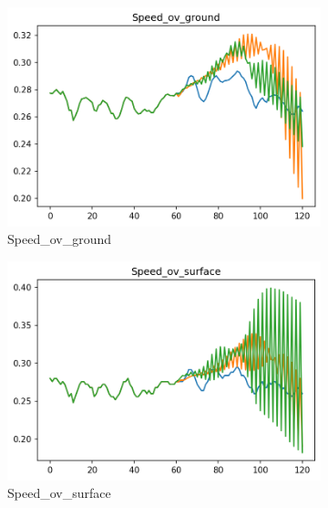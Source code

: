 \begin{figure}[ht]\ContinuedFloat
     \centering
     \begin{subfigure}[b]{0.32\textwidth}
         \centering
         \includegraphics[width=\textwidth]{figures/prediction-plots-joint/Speed_ov_ground.png}
         \caption{Speed\_ov\_ground}
     \end{subfigure}
     \begin{subfigure}[b]{0.32\textwidth}
         \centering
         \includegraphics[width=\textwidth]{figures/prediction-plots-joint/Speed_ov_surface.png}
         \caption{Speed\_ov\_surface}
     \end{subfigure}
     \begin{subfigure}[b]{0.32\textwidth}
         \centering

\end{subfigure}
\end{figure}
